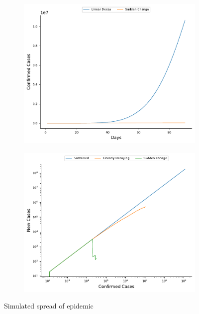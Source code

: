 \documentclass[12pt, twosided]{report}  %
\begin{document}
\begin{figure}[H]
	\begin{subfigure}[b]{0.25\textwidth}
		\includegraphics[width=\textwidth]{./images/plot_12.pdf}
		\label{plot_changinggrowthrate}
	\end{subfigure}
	\begin{subfigure}[b]{0.25\textwidth}
		\includegraphics[width=\textwidth]{./images/plot_13.pdf}
		\label{plot_behavioursimulated}
	\end{subfigure}
\caption{Simulated spread of epidemic}
\label{plot_simulated}
\end{figure}
\end{document}
